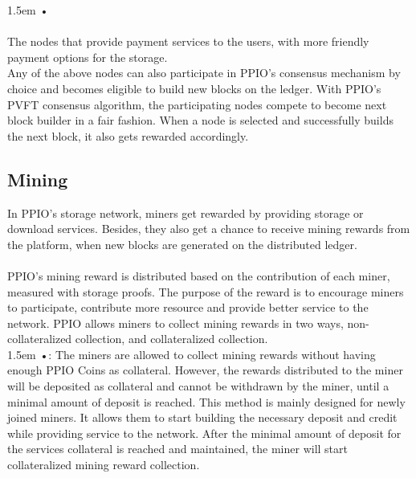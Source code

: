 \documentclass[10pt,a4paper]{article}
\begin{document}
\hangindent 1.5em
\noindent   
•
   \vspace{-0.5em}
\\ \\The nodes that provide payment services to the users, with more friendly payment options for the storage.
\\

\noindent   
Any of the above nodes can also participate in PPIO’s consensus mechanism by choice and becomes eligible to build new blocks on the ledger. With PPIO’s PVFT consensus algorithm, the participating nodes compete to become next block builder in a fair fashion. When a node is selected and successfully builds the next block, it also gets rewarded accordingly.
   \vspace{-0.5em}
      \subsection{Mining}  %
In PPIO’s storage network, miners get rewarded by providing storage or download services. Besides, they also get a chance to receive mining rewards from the platform, when new blocks are generated on the distributed ledger.
   \vspace{-0.5em}
\\ \\PPIO’s mining reward is distributed based on the contribution of each miner, measured with storage proofs. The purpose of the reward is to encourage miners to participate, contribute more resource and provide better service to the network. PPIO allows miners to collect mining rewards in two ways, non-collateralized collection, and collateralized collection.
   \vspace{-0.8em}
\\

\hangindent 1.5em
\noindent   
•: The miners are allowed to collect mining rewards without having enough PPIO Coins as collateral. However, the rewards distributed to the miner will be deposited as collateral and cannot be withdrawn by the miner, until a minimal amount of deposit is reached. This method is mainly designed for newly joined miners. It allows them to start building the necessary deposit and credit while providing service to the network. After the minimal amount of deposit for the services collateral is reached and maintained, the miner will start collateralized mining reward collection.
   \vspace{-0.8em}
\\
\end{document}
